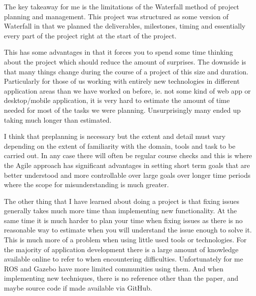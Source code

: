 \documentclass[]{../resources/final_report}
\begin{document}
The key takeaway for me is the limitations of the Waterfall method of project planning and 
management.
This project was structured as some version of Waterfall in that we planned the deliverables,
milestones, timing and essentially every part of the project right at the start of the project.

This has some advantages in that it forces you to spend some time thinking about the project which
should reduce the amount of surprises. The downside is that many things change during the course of
a project of this size and duration. Particularly for those of us working with entirely new 
technologies in different application areas than we have worked on before, ie. not some kind of web
app or desktop/mobile application, it is very hard to estimate the amount of time needed for
most of the tasks we were planning. Unsurprisingly many ended up taking much longer than estimated.

I think that preplanning is necessary but the extent and detail must vary depending on the extent 
of familiarity with the domain, tools and task to be carried out. In any case there will often be 
regular course checks and this is where the Agile approach has significant advantages in setting
short term goals that are better understood and more controllable over large goals over
longer time periods where the scope for misunderstanding is much greater.

The other thing that I have learned about doing a project is that fixing issues generally 
takes much more time than implementing new functionality. At the same time it is much 
harder to plan your time when fixing issues as there is no reasonable way to estimate when
you will understand the issue enough to solve it. This is much more of a problem when using
little used tools or technologies. For the majority of application development there is 
a large amount of knowledge available online to refer to when encountering difficulties. 
Unfortunately for me ROS and Gazebo have more limited communities using them. And when 
implementing new techniques, there is no reference other than the paper, and maybe source code
if made available via GitHub.



\newpage


\nocite{*}

\label{endpage}

\begin{appendices}

  
\end{appendices}
  
\end{document}
